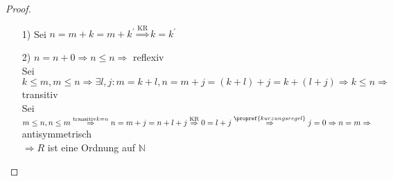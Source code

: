 \begin{proof}
	\begin{itemize}
		\item[1)] Sei $n=m+k=m+k^{'} \overset{\text{KR}}{\Rightarrow} k = k^{'}$
		\item[2)] $n=n+0 \Rightarrow n \leq n \Rightarrow$  reflexiv \\
		Sei $k \leq m , m \leq n \Rightarrow \exists l,j \colon m = k+l, n = m+j = (k+l)+j = k + (l+j) \Rightarrow k \leq n \Rightarrow$ transitiv\\
		Sei $m \leq n, n \leq m \overset{\text{transitiv} k = n}{\Rightarrow} n = m + j = n + l + j \overset{\text{KR}}{\Rightarrow} 0 = l+j \overset{\propref{kurzungsregel}}{\Rightarrow} j =0 \Rightarrow n = m \Rightarrow$ antisymmetrisch\\
		$\Rightarrow R$ ist eine Ordnung auf $\mathbb{N}$
	\end{itemize}
\end{proof}